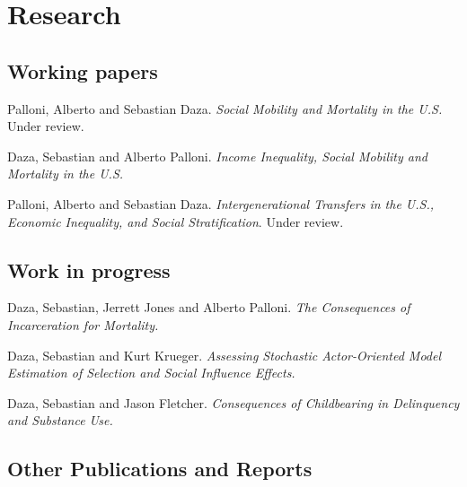 \documentclass[10pt,letterpaper]{article}
\renewenvironment{itemize}{
  \begin{list}{}{
    \setlength{\leftmargin}{1.5em}
    \setlength{\itemsep}{0.25em}
    \setlength{\parskip}{0pt}
    \setlength{\parsep}{0.25em}
  }
}{
  \end{list}
}
\begin{document}
\section*{Research}

\subsection*{Working papers}

\begin{itemize}

\item Palloni, Alberto and Sebastian Daza. {\textit{Social Mobility and Mortality in the U.S.}} Under review.

\item Daza, Sebastian and Alberto Palloni. {\textit{Income Inequality, Social Mobility and Mortality in the U.S.}}

\item Palloni, Alberto and Sebastian Daza. {\textit{Intergenerational Transfers in the U.S., Economic Inequality, and Social Stratification}}.
Under review.

\end{itemize}

\subsection*{Work in progress}

\begin{itemize}

\item Daza, Sebastian, Jerrett Jones and Alberto Palloni. {\textit{The Consequences of Incarceration for Mortality.}}

\item Daza, Sebastian and Kurt Krueger. {\textit{Assessing Stochastic Actor-Oriented Model Estimation of Selection and Social Influence Effects.}}
\end{itemize}

\item Daza, Sebastian and Jason Fletcher. {\textit{Consequences of Childbearing in Delinquency and Substance Use.}}

\subsection*{Other Publications and Reports}
\end{document}
